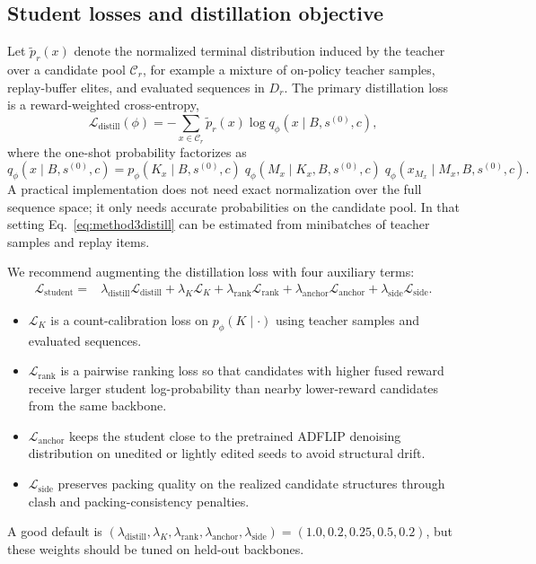 \documentclass[11pt]{article}
\begin{document}
\subsection{Student losses and distillation objective}

Let $\widetilde p_r(x)$ denote the normalized terminal distribution induced by the teacher over a candidate pool $\mathcal{C}_r$, for example a mixture of on-policy teacher samples, replay-buffer elites, and evaluated sequences in $D_r$. The primary distillation loss is a reward-weighted cross-entropy,
\begin{equation}
\label{eq:method3distill}
    \mathcal{L}_{\mathrm{distill}}(\phi)=-\sum_{x\in\mathcal{C}_r} \widetilde p_r(x)\log q_{\phi}(x\mid B,s^{(0)},c),
\end{equation}
where the one-shot probability factorizes as
\begin{equation}
    q_{\phi}(x\mid B,s^{(0)},c)=p_{\phi}(K_x\mid B,s^{(0)},c)\;q_{\phi}(M_x\mid K_x,B,s^{(0)},c)\;q_{\phi}(x_{M_x}\mid M_x,B,s^{(0)},c).
\end{equation}
A practical implementation does not need exact normalization over the full sequence space; it only needs accurate probabilities on the candidate pool. In that setting Eq.~\eqref{eq:method3distill} can be estimated from minibatches of teacher samples and replay items.

We recommend augmenting the distillation loss with four auxiliary terms:
\begin{align}
    \mathcal{L}_{\mathrm{student}} ={}& \lambda_{\mathrm{distill}}\mathcal{L}_{\mathrm{distill}} + \lambda_K\mathcal{L}_{K} + \lambda_{\mathrm{rank}}\mathcal{L}_{\mathrm{rank}} + \lambda_{\mathrm{anchor}}\mathcal{L}_{\mathrm{anchor}} + \lambda_{\mathrm{side}}\mathcal{L}_{\mathrm{side}}.
\end{align}
\begin{itemize}[leftmargin=1.5em]
    \item $\mathcal{L}_K$ is a count-calibration loss on $p_{\phi}(K\mid\cdot)$ using teacher samples and evaluated sequences.
    \item $\mathcal{L}_{\mathrm{rank}}$ is a pairwise ranking loss so that candidates with higher fused reward receive larger student log-probability than nearby lower-reward candidates from the same backbone.
    \item $\mathcal{L}_{\mathrm{anchor}}$ keeps the student close to the pretrained ADFLIP denoising distribution on unedited or lightly edited seeds to avoid structural drift.
    \item $\mathcal{L}_{\mathrm{side}}$ preserves packing quality on the realized candidate structures through clash and packing-consistency penalties.
\end{itemize}
A good default is $(\lambda_{\mathrm{distill}},\lambda_K,\lambda_{\mathrm{rank}},\lambda_{\mathrm{anchor}},\lambda_{\mathrm{side}})=(1.0,0.2,0.25,0.5,0.2)$, but these weights should be tuned on held-out backbones.
\end{document}
